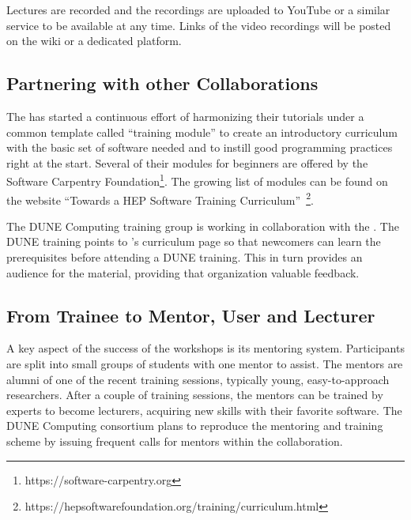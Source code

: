 \documentclass[../main-v1.tex]{subfiles}
\begin{document}
Lectures are  recorded and the recordings are uploaded to YouTube or a similar service to be available at any time.  Links of the video recordings will be posted on the wiki or a dedicated platform. %

\subsection{Partnering with other Collaborations}
The  has started a continuous effort of harmonizing their tutorials under a common template called ``training module'' %
to create an introductory curriculum %
with the basic set of software needed %
and to instill good programming practices right at the start. Several of their modules for beginners are offered by the Software Carpentry Foundation\footnote{https://software-carpentry.org}. The growing list of modules can be found on the  website ``Towards a HEP Software Training Curriculum''~\footnote{https://hepsoftwarefoundation.org/training/curriculum.html}.

The DUNE Computing training group is working in collaboration with the . The DUNE training %
points to 's curriculum page so that %
newcomers can learn the prerequisites before attending a %
DUNE training. This %
in turn provides an audience for the  material, %
providing that organization valuable feedback. %

\subsection{From Trainee to Mentor, User and Lecturer}
A key aspect of the success of the  workshops %
is its mentoring system. Participants are split into small groups of students with one mentor to assist. %
The mentors are %
alumni of %
one of the recent training sessions, typically young, easy-to-approach researchers. %
After a couple of training sessions, the mentors can be trained by experts to become lecturers, acquiring new skills with their favorite software. The DUNE Computing consortium plans to reproduce the  mentoring and training scheme %
by issuing frequent calls for mentors within the collaboration.
\end{document}

